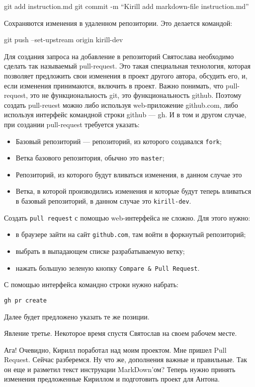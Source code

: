 \documentclass[14pt,a4paper]{article}
\begin{document}
git add instruction.md
git commit -m ``Kirill add markdown-file instruction.md''

Сохраняются изменения в удаленном репозитории. Это делается командой:

git push --set-upstream origin kirill-dev

Для создания запроса на добавление в репозиторий Святослава необходимо сделать так называемый
pull-request. Это такая специальная технология, которая позволяет предложить свои изменения 
в проект другого автора, обсудить его, и, если изменения принимаются, включить в проект.
Важно понимать, что  pull-request, это не функциональность git, это функциональность github.
Поэтому создать pull-reuest можно либо используя web-приложение github.com, либо 
используя интерфейс командной строки github --- gh. И в том и другом случае, при создании 
pull-request требуется указать:
\begin{itemize}
	\item Базовый репозиторий --- репозиторий, из которого создавался \texttt{fork};
	\item Ветка базового репозитория, обычно это \texttt{master};
	\item Репозиторий, из которого будут вливаться изменения, в данном случае это
	\item Ветка, в которой производились изменения и которые будут теперь вливаться в 
		базовый репозиторий, в данном случае это \texttt{kirill-dev}.
\end{itemize}
Создать \texttt{pull request} с помощью web-интерфейса не сложно. Для этого нужно:
\begin{itemize}
	\item в браузере зайти на сайт \texttt{github.com}, там войти в форкнутый репозиторий;
	\item выбрать в выпадающем списке разрабатываемую ветку;
	\item нажать большую зеленую кнопку \texttt{Compare \& Pull Request}.
\end{itemize}
С помощью интерфейса командно строки нужно набрать:
\begin{verbatim}
gh pr create
\end{verbatim}
Далее будет предложено указать те же позиции.

Явление третье.
Некоторое время спустя Святослав на своем рабочем месте.

 Ага! Очевидно, Кирилл поработал над моим проектом. Мне пришел  Pull Request.
Сейчас разберемся. Ну что же, дополнения важные и правильные. Так он еще и разметил текст
инструкции MarkDown'ом? 
Теперь нужно принять изменения предложенные Кириллом и подготовить проект для Антона.
\end{document}
